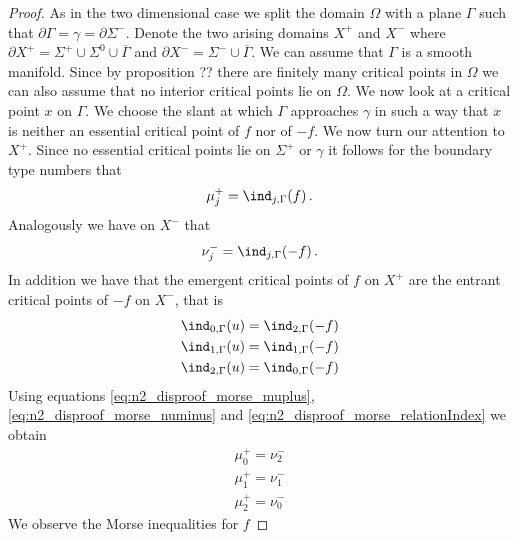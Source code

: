 \begin{proof}
  As in the two dimensional case we split the domain $\Omega$ with a plane $\Gamma$ such that
  $\partial\Gamma=\gamma=\partial\Sigma^-$.
  Denote the two arising domains $X^+$ and $X^-$ where $\partial X^+=\Sigma^+\cup\Sigma^0\cup\overline{\Gamma}$ and
  $\partial X^-=\Sigma^-\cup\overline{\Gamma}$.
  We can assume that $\Gamma$ is a smooth manifold.
  Since by proposition ?? there are finitely many critical points in $\Omega$
  we can also assume that no interior critical points lie on $\Omega$.
  We now look at a critical point $x$ on $\Gamma$.
  We choose the slant at which $\Gamma$ approaches $\gamma$ in such a way that $x$
  is neither an essential critical point of $f$ nor of $-f$.
  We now turn our attention to $X^+$. Since no essential critical points lie on $\Sigma^+$ or
  $\gamma$ it follows for the boundary type numbers that
  \begin{align}
    \mu^+_j=\ind_{j,\Gamma}(f)\,.\label{eq:n2_disproof_morse_muplus}
  \end{align}
  Analogously we have on $X^-$ that
  \begin{align}
    \nu^-_j=\ind_{j,\Gamma}(-f)\,.\label{eq:n2_disproof_morse_numinus}
  \end{align}
  In addition we have that the emergent critical points of $f$ on $X^+$ are the
  entrant critical points of $-f$ on $X^-$, that is
  \begin{equation}
    \begin{aligned}
      \ind_{0,\Gamma}(u)=\ind_{2,\Gamma}(-f) \\
      \ind_{1,\Gamma}(u)=\ind_{1,\Gamma}(-f) \\
      \ind_{2,\Gamma}(u)=\ind_{0,\Gamma}(-f)\label{eq:n2_disproof_morse_relationIndex} 
    \end{aligned}
  \end{equation}
  Using equations \eqref{eq:n2_disproof_morse_muplus}, \eqref{eq:n2_disproof_morse_numinus} and \eqref{eq:n2_disproof_morse_relationIndex}
  we obtain
  \begin{equation}
    \begin{aligned}
      \mu^+_0=\nu^-_2 \\
      \mu^+_1=\nu^-_1 \\
      \mu^+_2=\nu^-_0\label{eq:n2_disproof_morse_relationMuNu}
    \end{aligned}
  \end{equation}
  We observe the Morse inequalities for $f$

\end{proof}
